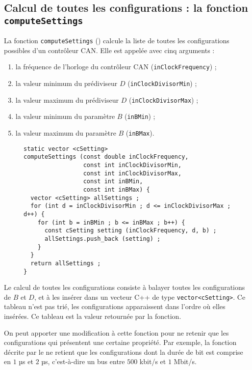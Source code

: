 \subsection{Calcul de toutes les configurations : la fonction \texttt{computeSettings}}

La fonction \texttt{computeSettings} () calcule la liste de toutes les configurations possibles d'un contrôleur CAN. Elle est appelée avec cinq arguments :
\begin{enumerate}
  \item la fréquence de l'horloge du contrôleur CAN (\texttt{inClockFrequency}) ;
  \item la valeur minimum du prédiviseur $D$ (\texttt{inClockDivisorMin}) ;
  \item la valeur maximum du prédiviseur $D$ (\texttt{inClockDivisorMax}) ;
  \item la valeur minimum du paramètre $B$ (\texttt{inBMin}) ;
  \item la valeur maximum du paramètre $B$ (\texttt{inBMax}).
\end{enumerate}



\begin{figure}[!ht]
\begin{lstlisting}
static vector <cSetting>
computeSettings (const double inClockFrequency,
                 const int inClockDivisorMin,
                 const int inClockDivisorMax,
                 const int inBMin,
                 const int inBMax) {
  vector <cSetting> allSettings ;
  for (int d = inClockDivisorMin ; d <= inClockDivisorMax ; d++) {
    for (int b = inBMin ; b <= inBMax ; b++) {
      const cSetting setting (inClockFrequency, d, b) ;
      allSettings.push_back (setting) ;
    }
  }
  return allSettings ;
}
\end{lstlisting}
\end{figure}


Le calcul de toutes les configurations consiste à balayer toutes les configurations de $B$ et $D$, et à les insérer dans un vecteur C++ de type \texttt{vector<cSetting>}. Ce tableau n'est pas trié, les configurations apparaissent dans l'ordre où elles insérées. Ce tableau est la valeur retournée par la fonction.

On peut apporter une modification à cette fonction pour ne retenir que les configurations qui présentent une certaine propriété. Par exemple, la fonction décrite par le  ne retient que les configurations dont la durée de bit est comprise en $1$ µs et $2$ µs, c'est-à-dire un bus entre $500$ kbit/s et $1$ Mbit/s.



